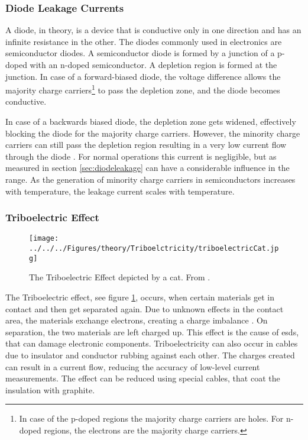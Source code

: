 \subsubsection{Diode Leakage Currents}
A diode, in theory, is a device that is conductive only in one direction and has an infinite resistance in the other. The diodes commonly used in electronics are semiconductor diodes. A semiconductor diode is formed by a junction of a p-doped with an n-doped semiconductor. A depletion region is formed at the junction. In case of a forward-biased diode, the voltage difference allows the majority charge carriers\footnote{In case of the p-doped regions the majority charge carriers are holes. For n-doped regions, the electrons are the majority charge carriers.} to pass the depletion zone, and the diode becomes conductive.

In case of a backwards biased diode, the depletion zone gets widened, effectively blocking the diode for the majority charge carriers. However, the minority charge carriers can still pass the depletion region resulting in a very low current flow through the diode \cite{Festkörperphysik}. For normal operations this current is negligible, but as measured in section \ref{sec:diodeleakage} can have a considerable influence in the \SI{}{\pico\amp} range.
As the generation of minority charge carriers in semiconductors increases with temperature, the leakage current scales with temperature. 
\subsubsection{Triboelectric Effect}
\begin{figure}
	\centering
	\texttt{[image: ../../../Figures/theory/Triboelctricity/triboelectricCat.jpg]}
	\caption{The Triboelectric Effect depicted by a cat. From \cite{wikiCat}.}
	\label{fig:theory:tribo}
\end{figure}
The Triboelectric effect, see figure \ref{fig:theory:tribo}, occurs, when certain materials get in contact and then get separated again. Due to unknown effects in the contact area, the materials exchange electrons, creating a charge imbalance \cite{Lacks_2011}. On separation, the two materials are left charged up. This effect is the cause of \acp{esd}, that can damage electronic components. Triboelectricity can also occur in cables due to insulator and conductor rubbing against each other. The charges created can result in a current flow, reducing the accuracy of low-level current measurements. The effect can be reduced using special cables, that coat the insulation with graphite.
